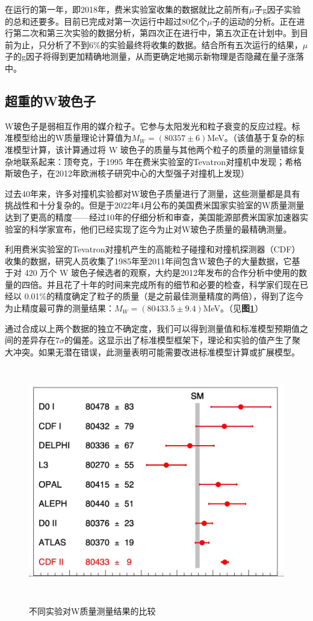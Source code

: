 在运行的第一年，即2018年，费米实验室收集的数据就比之前所有$\mu$子g因子实验的总和还要多。目前已完成对第一次运行中超过80亿个$\mu$子的运动的分析。正在进行第二次和第三次实验的数据分析，第四次正在进行中，第五次正在计划中。到目前为止，只分析了不到6\%的实验最终将收集的数据。结合所有五次运行的结果，$\mu$子的g因子将得到更加精确地测量，从而更确定地揭示新物理是否隐藏在量子涨落中。

\subsection{超重的W玻色子}
W玻色子是弱相互作用的媒介粒子。它参与太阳发光和粒子衰变的反应过程。标准模型给出的W质量理论计算值为$M_W=(80357\pm6)$MeV。（该值基于复杂的标准模型计算，该计算通过将 W 玻色子的质量与其他两个粒子的质量的测量错综复杂地联系起来：顶夸克，于1995 年在费米实验室的Tevatron对撞机中发现\cite{top_quark_discovery}；希格斯玻色子，在2012年欧洲核子研究中心的大型强子对撞机上发现\cite{Higgs_discovery}）

过去40年来，许多对撞机实验都对W玻色子质量进行了测量，这些测量都是具有挑战性和十分复杂的。但是于2022年4月公布的美国费米国家实验室的W质量测量\cite{Wmass}达到了更高的精度——经过10年的仔细分析和审查，美国能源部费米国家加速器实验室的科学家宣布，他们已经实现了迄今为止对W玻色子质量的最精确测量。

利用费米实验室的Tevatron对撞机产生的高能粒子碰撞和对撞机探测器（CDF）收集的数据，研究人员收集了1985年至2011年间包含W玻色子的大量数据，它基于对 420 万个 W 玻色子候选者的观察，大约是2012年发布的合作分析中使用的数量的四倍。并且花了十年的时间来完成所有的细节和必要的检查，科学家们现在已经以 0.01\%的精度确定了粒子的质量（是之前最佳测量精度的两倍），得到了迄今为止精度最可靠的测量结果：$M_W=(80433.5\pm9.4)$MeV。（见\textbf{图\ref{fig:1.3}}）

通过合成以上两个数据的独立不确定度，我们可以得到测量值和标准模型预期值之间的差异存在$7\sigma$的偏差。这显示出了标准模型框架下，理论和实验的值产生了聚大冲突。如果无潜在错误，此测量表明可能需要改进标准模型计算或扩展模型。

\begin{figure}[H]
 \centering
 \caption{不同实验对W质量测量结果的比较\cite{Wmass_fig}}
 \includegraphics[height=10cm, width=12cm]{pictures/w-boson-comparisons.jpeg}
 \label{fig:1.3}
\end{figure}




